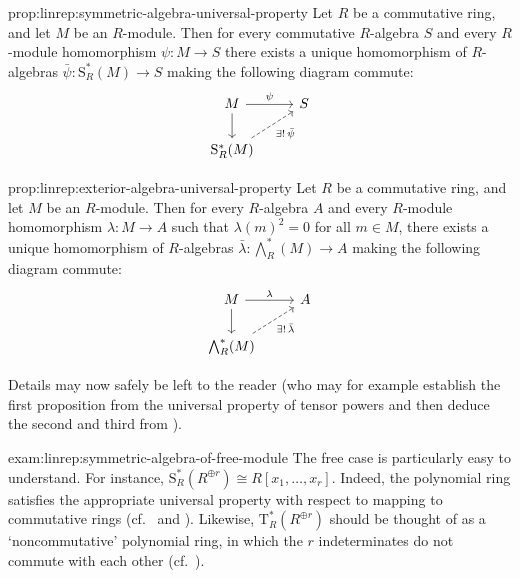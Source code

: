 \begin{prop}{}{prop:linrep:symmetric-algebra-universal-property}
  Let $R$ be a commutative ring, and let $M$ be an $R$-module. Then
  for every commutative $R$-algebra $S$ and every $R$-module
  homomorphism $\psi : M \to S$ there exists a unique homomorphism of
  $R$-algebras $\bar\psi : \mathrm{S}^*_R(M) \to S$ making the
  following diagram commute:
  \[
    \begin{tikzcd}
      M \ar[r, "\psi"] \ar[d] & S \\
      \mathrm{S}^*_R(M) \ar[ur, dashed, "\exists!\,\bar\psi"']
    \end{tikzcd}
  \]
\end{prop}

\begin{prop}{}{prop:linrep:exterior-algebra-universal-property}
  Let $R$ be a commutative ring, and let $M$ be an $R$-module. Then
  for every $R$-algebra $A$ and every $R$-module homomorphism
  $\lambda : M \to A$ such that $\lambda(m)^2 = 0$ for all $m \in M$,
  there exists a unique homomorphism of $R$-algebras
  $\bar\lambda : \bigwedge^*_R(M) \to A$ making the following diagram
  commute:
  \[
    \begin{tikzcd}
      M \ar[r, "\lambda"] \ar[d] & A \\
      \bigwedge^*_R(M) \ar[ur, dashed, "\exists!\,\bar\lambda"']
    \end{tikzcd}
  \]
\end{prop}

Details may now safely be left to the reader (who may for example
establish the first proposition from the universal property of tensor
powers and then deduce the second and third from
).
\begin{exam}{}{exam:linrep:symmetric-algebra-of-free-module}
  The free case is particularly easy to understand. For instance,
  $\mathrm{S}^*_R(R^{\oplus r}) \cong R[x_1, \dots, x_r]$. Indeed, the
  polynomial ring satisfies the appropriate universal property with
  respect to mapping to commutative rings (cf.\
   and
  ). Likewise,
  $\mathrm{T}^*_R(R^{\oplus r})$ should be thought of as a
  `noncommutative' polynomial ring, in which the $r$ indeterminates do
  not commute with each other (cf.\
  ).
\end{exam}

